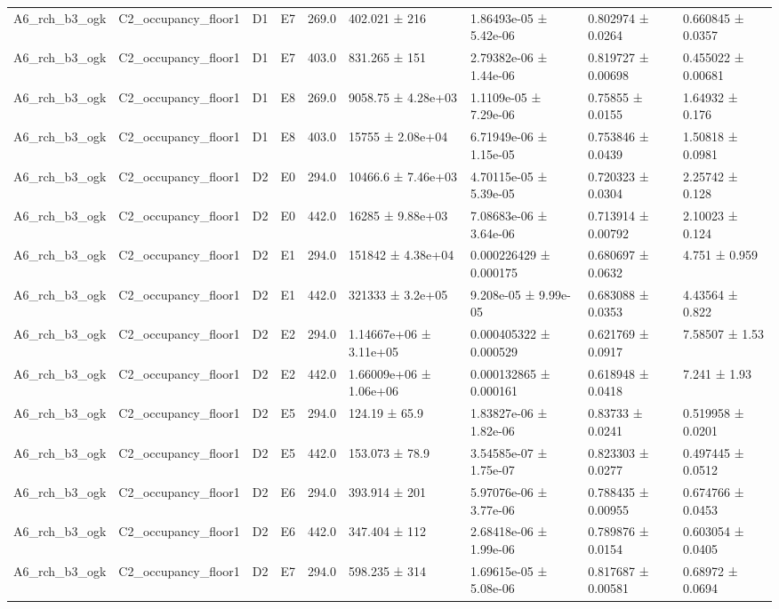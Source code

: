 \begin{table}
\begin{tabular}{lllllllll}
A6\_rch\_b3\_ogk & C2\_occupancy\_floor1 & D1 & E7 & 269.0 & 402.021 ± 216 & 1.86493e-05 ± 5.42e-06 & 0.802974 ± 0.0264 & 0.660845 ± 0.0357 \\
A6\_rch\_b3\_ogk & C2\_occupancy\_floor1 & D1 & E7 & 403.0 & 831.265 ± 151 & 2.79382e-06 ± 1.44e-06 & 0.819727 ± 0.00698 & 0.455022 ± 0.00681 \\
A6\_rch\_b3\_ogk & C2\_occupancy\_floor1 & D1 & E8 & 269.0 & 9058.75 ± 4.28e+03 & 1.1109e-05 ± 7.29e-06 & 0.75855 ± 0.0155 & 1.64932 ± 0.176 \\
A6\_rch\_b3\_ogk & C2\_occupancy\_floor1 & D1 & E8 & 403.0 & 15755 ± 2.08e+04 & 6.71949e-06 ± 1.15e-05 & 0.753846 ± 0.0439 & 1.50818 ± 0.0981 \\
A6\_rch\_b3\_ogk & C2\_occupancy\_floor1 & D2 & E0 & 294.0 & 10466.6 ± 7.46e+03 & 4.70115e-05 ± 5.39e-05 & 0.720323 ± 0.0304 & 2.25742 ± 0.128 \\
A6\_rch\_b3\_ogk & C2\_occupancy\_floor1 & D2 & E0 & 442.0 & 16285 ± 9.88e+03 & 7.08683e-06 ± 3.64e-06 & 0.713914 ± 0.00792 & 2.10023 ± 0.124 \\
A6\_rch\_b3\_ogk & C2\_occupancy\_floor1 & D2 & E1 & 294.0 & 151842 ± 4.38e+04 & 0.000226429 ± 0.000175 & 0.680697 ± 0.0632 & 4.751 ± 0.959 \\
A6\_rch\_b3\_ogk & C2\_occupancy\_floor1 & D2 & E1 & 442.0 & 321333 ± 3.2e+05 & 9.208e-05 ± 9.99e-05 & 0.683088 ± 0.0353 & 4.43564 ± 0.822 \\
A6\_rch\_b3\_ogk & C2\_occupancy\_floor1 & D2 & E2 & 294.0 & 1.14667e+06 ± 3.11e+05 & 0.000405322 ± 0.000529 & 0.621769 ± 0.0917 & 7.58507 ± 1.53 \\
A6\_rch\_b3\_ogk & C2\_occupancy\_floor1 & D2 & E2 & 442.0 & 1.66009e+06 ± 1.06e+06 & 0.000132865 ± 0.000161 & 0.618948 ± 0.0418 & 7.241 ± 1.93 \\
A6\_rch\_b3\_ogk & C2\_occupancy\_floor1 & D2 & E5 & 294.0 & 124.19 ± 65.9 & 1.83827e-06 ± 1.82e-06 & 0.83733 ± 0.0241 & 0.519958 ± 0.0201 \\
A6\_rch\_b3\_ogk & C2\_occupancy\_floor1 & D2 & E5 & 442.0 & 153.073 ± 78.9 & 3.54585e-07 ± 1.75e-07 & 0.823303 ± 0.0277 & 0.497445 ± 0.0512 \\
A6\_rch\_b3\_ogk & C2\_occupancy\_floor1 & D2 & E6 & 294.0 & 393.914 ± 201 & 5.97076e-06 ± 3.77e-06 & 0.788435 ± 0.00955 & 0.674766 ± 0.0453 \\
A6\_rch\_b3\_ogk & C2\_occupancy\_floor1 & D2 & E6 & 442.0 & 347.404 ± 112 & 2.68418e-06 ± 1.99e-06 & 0.789876 ± 0.0154 & 0.603054 ± 0.0405 \\
A6\_rch\_b3\_ogk & C2\_occupancy\_floor1 & D2 & E7 & 294.0 & 598.235 ± 314 & 1.69615e-05 ± 5.08e-06 & 0.817687 ± 0.00581 & 0.68972 ± 0.0694 \\

\end{tabular}
\end{table}
